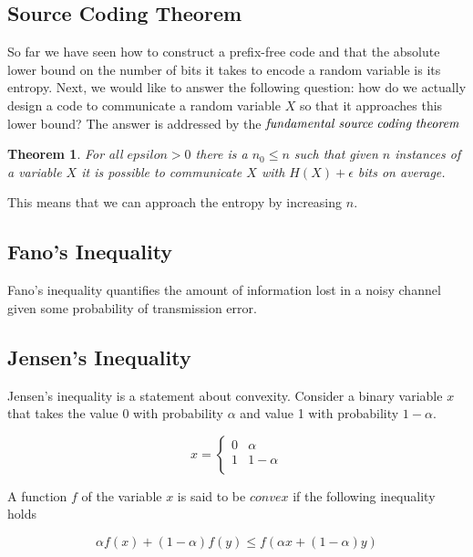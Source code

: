 \documentclass[a4paper,11pt]{book}
\newtheorem{theorem}{Theorem}
\begin{document}
\subsection{Source Coding Theorem}

So far we have seen how to construct a prefix-free code and that the absolute lower bound on the number of bits it takes to encode a random variable is its entropy. Next, we would like to answer the following question: how do we actually design a code to communicate a random variable $X$ so that it approaches this lower bound?  The answer is addressed by the $\it{fundamental \; source \; coding \; theorem}$ 

\begin{theorem}
For all $epsilon > 0$ there is a $n_{0} \leq n$ such that given $n$ instances of a variable $X$ it is possible to communicate $X$ with $H(X) + \epsilon$ bits on average.
\end{theorem}

This means that we can approach the entropy by increasing $n$.


\subsection{Fano's Inequality}

Fano's inequality quantifies the amount of information lost in a noisy channel given some probability of transmission error. 

\subsection{Jensen's Inequality}

Jensen's inequality is a statement about convexity. Consider a binary variable $x$ that takes the value 0 with probability $\alpha$ and value 1 with probability $1-\alpha$.

\[x= \begin{cases} 
      0 & \alpha \\
      1 & 1-\alpha \\
   \end{cases}
\]

A function $f$ of the variable $x$ is said to be $\textit{convex}$ if the following inequality holds

\begin{equation*}
\alpha f(x) + (1-\alpha)f(y) \leq f(\alpha x + (1-\alpha)y)
\end{equation*}
\end{document}
